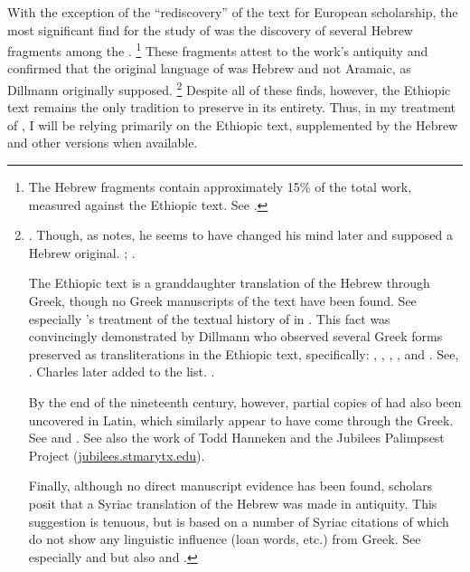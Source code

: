 With the exception of the ``rediscovery'' of the text for European scholarship, the most significant find for the study of \jub was the discovery of several Hebrew fragments among the \dss.%
    \footnote{The Hebrew fragments contain approximately 15\% of the total work, measured against the Ethiopic text. See \cite[124]{stokl_henoch2006}.}
These fragments attest to the work's antiquity and confirmed that the original language of \jub was Hebrew and not Aramaic, as Dillmann originally supposed.%
        \footnote{\Cite[90]{dillamnn_jbw1850}. Though, as \vanderkam notes, he seems to have changed his mind later and supposed a Hebrew original. \cite[324]{dillmann_spaw1883}; \cite[1:1 n. 1]{vanderkam2018}.

        The Ethiopic text is a granddaughter translation of the Hebrew through Greek, though no Greek manuscripts of the text have been found. See especially \vanderkam's treatment of the textual history of \jub in \cite*[1--18]{vanderkam1977}. This fact was convincingly demonstrated by Dillmann who observed several Greek forms preserved as transliterations in the Ethiopic text, specifically: , , , , and . See, \cite[88]{dillamnn_jbw1850}. Charles later added  to the list. \cite[xxx]{charles1902}.

        By the end of the nineteenth century, however, partial copies of \jub had also been uncovered in Latin, which similarly appear to have come through the Greek.
        See
                \cite[15--54]{ceriani1861} and
                \cite{ronsch1874}.
        See also the work of Todd Hanneken and the Jubilees Palimpsest Project (\href{http://jubilees.stmarytx.edu}{jubilees.stmarytx.edu}).

        Finally, although no direct manuscript evidence has been found, \jub scholars posit that a Syriac translation of the Hebrew was made in antiquity. This suggestion is tenuous, but is based on a number of Syriac citations of \jub which do not show any linguistic influence (loan words, etc.) from Greek.
        See especially
                \cite[231--232]{tisserant_rb1921} and 
                \cite[xxix]{charles1902} but also 
                \cite[2:ix--x]{ceriani1861} and 
                \cite[x]{charles1895}.}
Despite all of these finds, however, the Ethiopic text remains the only tradition to preserve \jub in its entirety. Thus, in my treatment of \jub, I will be relying primarily on the Ethiopic text, supplemented by the Hebrew and other versions when available.

